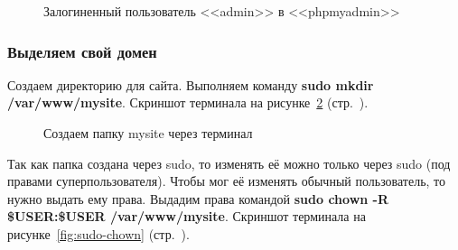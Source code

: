 \begin{figure}[p]
    \caption{Залогиненный пользователь <<admin>> в <<phpmyadmin>>}
    \label{fig:make-phpmyadmin-superuser-step-7}
\end{figure}

\newpage


\subsubsection{Выделяем свой домен}

Создаем директорию для сайта. Выполняем команду \textbf{sudo mkdir /var/www/mysite}.
Скриншот терминала на рисунке~\ref{fig:sudo-mkdir-mysite} (стр.~\pageref{fig:sudo-mkdir-mysite}).

\begin{figure}[p]
    \caption{Создаем папку mysite через терминал}
    \label{fig:sudo-mkdir-mysite}
\end{figure}

Так как папка создана через sudo, то изменять её можно только через sudo (под правами суперпользователя). Чтобы мог её изменять обычный пользователь, то нужно выдать ему права. Выдадим права командой \textbf{sudo chown -R \$USER:\$USER /var/www/mysite}.
Скриншот терминала на рисунке~\ref{fig:sudo-chown} (стр.~\pageref{fig:sudo-chown}).

